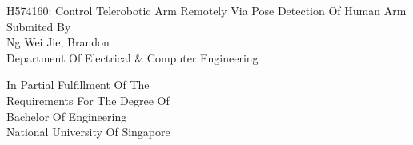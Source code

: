 \begin{titlepage}
	\begin{center}
		\vspace*{0px}
		\small{H574160: Control Telerobotic Arm Remotely Via Pose Detection Of Human Arm}\\

		\vspace*{240px}
		\small{Submited By}\\
		\small{Ng Wei Jie, Brandon} \\
		\small{Department Of Electrical \& Computer Engineering}

		\vspace*{240px}
		\small{In Partial Fulfillment Of The}\\
		\small{Requirements For The Degree Of}\\
		\small{Bachelor Of Engineering}\\
		\small{National University Of Singapore}\\

	\end{center}
\end{titlepage}